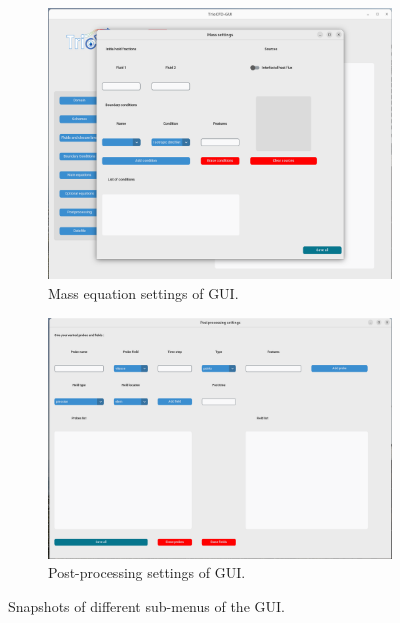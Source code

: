 \begin{figure}[htbp]
\begin{subfigure}[b]{0.45\textwidth}
\centering 
\includegraphics[scale=0.2]{Figure/Guimass.png} 
\caption{Mass equation settings of GUI.} 
\end{subfigure} \hfill 
\begin{subfigure}[b]{0.45\textwidth} 
\centering 
\includegraphics[scale=0.175]{Figure/Guipost.png} 
\caption{Post-processing settings of GUI.}  
\end{subfigure} 
\caption{Snapshots of different sub-menus of the GUI.}  
\end{figure} 